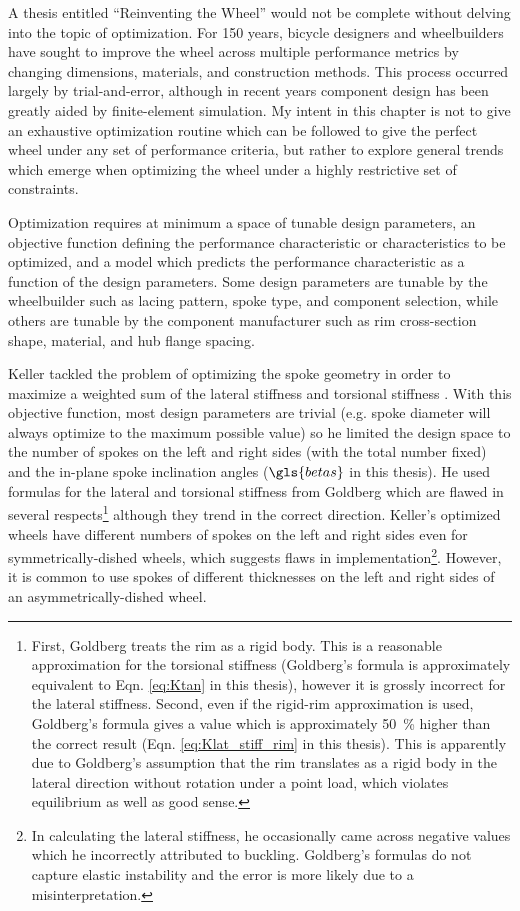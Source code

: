 \documentclass[\rootdir/thesis.tex]{subfiles}
\begin{document}
A thesis entitled ``Reinventing the Wheel'' would not be complete without delving into the topic of optimization. For 150 years, bicycle designers and wheelbuilders have sought to improve the wheel across multiple performance metrics by changing dimensions, materials, and construction methods. This process occurred largely by trial-and-error, although in recent years component design has been greatly aided by finite-element simulation. My intent in this chapter is not to give an exhaustive optimization routine which can be followed to give the perfect wheel under any set of performance criteria, but rather to explore general trends which emerge when optimizing the wheel under a highly restrictive set of constraints.

Optimization requires at minimum a space of tunable design parameters, an objective function defining the performance characteristic or characteristics to be optimized, and a model which predicts the performance characteristic as a function of the design parameters. Some design parameters are tunable by the wheelbuilder such as lacing pattern, spoke type, and component selection, while others are tunable by the component manufacturer such as rim cross-section shape, material, and hub flange spacing.

Keller tackled the problem of optimizing the spoke geometry in order to maximize a weighted sum of the lateral stiffness and torsional stiffness \cite{Keller2013}. With this objective function, most design parameters are trivial (e.g. spoke diameter will always optimize to the maximum possible value) so he limited the design space to the number of spokes on the left and right sides (with the total number fixed) and the in-plane spoke inclination angles ($\gls{betas}$ in this thesis). He used formulas for the lateral and torsional stiffness from Goldberg \cite{Goldberg1984} which are flawed in several respects\footnote{First, Goldberg treats the rim as a rigid body. This is a reasonable approximation for the torsional stiffness (Goldberg's formula is approximately equivalent to Eqn. \ref{eq:Ktan} in this thesis), however it is grossly incorrect for the lateral stiffness. Second, even if the rigid-rim approximation is used, Goldberg's formula gives a value which is approximately \SI{50}{\percent} higher than the correct result (Eqn. \ref{eq:Klat_stiff_rim} in this thesis). This is apparently due to Goldberg's assumption that the rim translates as a rigid body in the lateral direction without rotation under a point load, which violates equilibrium as well as good sense.} although they trend in the correct direction. Keller's optimized wheels have different numbers of spokes on the left and right sides even for symmetrically-dished wheels, which suggests flaws in implementation\footnote{In calculating the lateral stiffness, he occasionally came across negative values which he incorrectly attributed to buckling. Goldberg's formulas do not capture elastic instability and the error is more likely due to a misinterpretation.}. However, it is common to use spokes of different thicknesses on the left and right sides of an asymmetrically-dished wheel.
\end{document}
